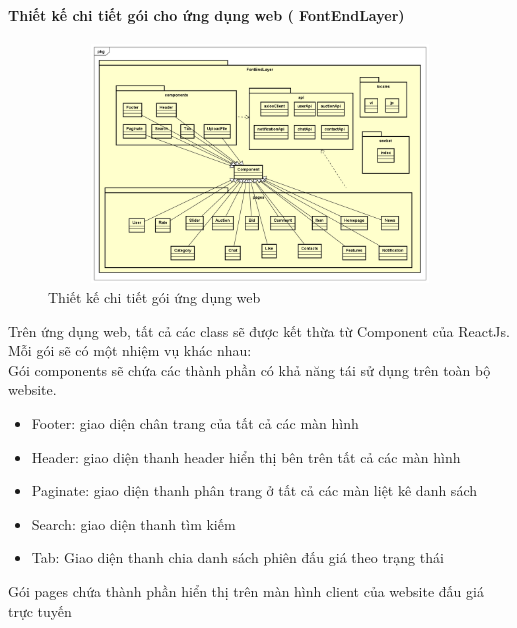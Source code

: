 \documentclass{article}
\begin{document}
\paragraph{Thiết kế chi tiết gói cho ứng dụng web ( FontEndLayer)
} \mbox{}
\begin{figure}[H]
    \centering
    \includegraphics[width=11.4cm,height=6.34cm]{images/fontendlayer.png}
    \caption{Thiết kế chi tiết gói ứng dụng web}
    \label{hinh44}
\end{figure}
Trên ứng dụng web, tất cả các class sẽ được kết thừa từ Component của ReactJs.\\
Mỗi gói sẽ có một nhiệm vụ khác nhau: \\
Gói components sẽ chứa các thành phần có khả năng tái sử dụng trên toàn bộ website.
\begin{itemize}
    \item Footer: giao diện chân trang của tất cả các màn hình
    \item Header: giao diện thanh header hiển thị bên trên tất cả các màn hình
    \item Paginate: giao diện thanh phân trang ở tất cả các màn liệt kê danh sách
    \item Search: giao diện thanh tìm kiếm
    \item Tab: Giao diện thanh chia danh sách phiên đấu giá theo trạng thái
\end{itemize}
Gói pages chứa thành phần hiển thị trên màn hình client của website đấu giá trực tuyến
\end{document}

